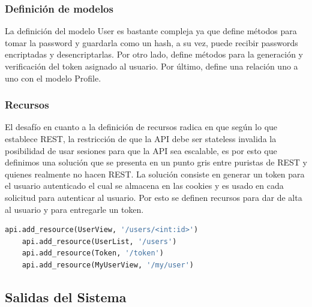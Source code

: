 \documentclass[a4paper,12pt]{article}
\begin{document}
\subsubsection{Definición de modelos}
La definición del modelo User es bastante compleja ya que define métodos para tomar la password  y guardarla como un hash, a su vez, puede recibir passwords encriptadas y desencriptarlas. Por otro lado, define métodos para la generación y verificación del token asignado al usuario. Por último, define una relación uno a uno con el modelo Profile.

\subsubsection{Recursos}
El desafío en cuanto a la definición de recursos radica en que según lo que establece REST, la restricción de que la API debe ser stateless invalida la posibilidad de usar sesiones para que la API sea escalable, es por esto que definimos una solución que se presenta en un punto gris entre puristas de REST y quienes realmente no hacen REST. La solución consiste en generar un token para el usuario autenticado el cual se almacena en las cookies y es usado en cada solicitud para autenticar al usuario. Por esto se definen recursos para dar de alta al usuario y para entregarle un token.

	\begin{lstlisting}[language=Python]
	api.add_resource(UserView, '/users/<int:id>')
	api.add_resource(UserList, '/users')
	api.add_resource(Token, '/token')
	api.add_resource(MyUserView, '/my/user')
	\end{lstlisting}

\subsection {Salidas del Sistema}
\end{document}

